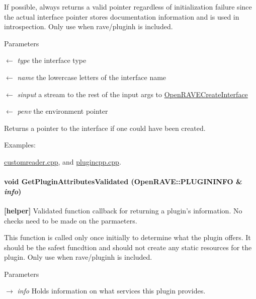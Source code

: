 If possible, always returns a valid pointer regardless of initialization failure since the actual interface pointer stores documentation information and is used in introspection. Only use when rave/pluginh is included. 
\begin{DoxyParams}{Parameters}
\item[\mbox{$\leftarrow$} {\em type}]the interface type \item[\mbox{$\leftarrow$} {\em name}]the lowercase letters of the interface name \item[\mbox{$\leftarrow$} {\em sinput}]a stream to the rest of the input args to \hyperlink{group__plugin__exports_ga6251cc7d3b33f6109ca5d346def08370}{OpenRAVECreateInterface} \item[\mbox{$\leftarrow$} {\em penv}]the environment pointer \end{DoxyParams}
\begin{DoxyReturn}{Returns}
a pointer to the interface if one could have been created. 
\end{DoxyReturn}
\begin{Desc}
\item[Examples: ]\par
\hyperlink{customreader_8cpp-example}{customreader.cpp}, and \hyperlink{plugincpp_8cpp-example}{plugincpp.cpp}.\end{Desc}
\hypertarget{group__plugin__exports_gaf90c03438b94cc76e7b8a54d445ec106}{
\paragraph[{GetPluginAttributesValidated}]{\setlength{\rightskip}{0pt plus 5cm}void GetPluginAttributesValidated ({\bf OpenRAVE::PLUGININFO} \& {\em info})}\hfill}
\label{group__plugin__exports_gaf90c03438b94cc76e7b8a54d445ec106}


{\bfseries {\bfseries }\mbox{[}helper\mbox{]}} Validated function callback for returning a plugin's information. No checks need to be made on the parmaeters. 

This function is called only once initially to determine what the plugin offers. It should be the safest funcdtion and should not create any static resources for the plugin. Only use when rave/pluginh is included. 
\begin{DoxyParams}{Parameters}
\item[\mbox{$\rightarrow$} {\em info}]Holds information on what services this plugin provides. \end{DoxyParams}
